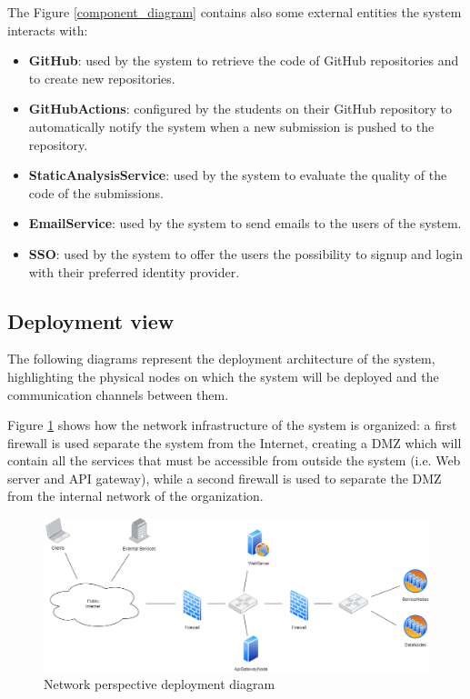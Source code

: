 The Figure \ref{component_diagram} contains also some external entities the system interacts with:
\begin{itemize}
    \item \textbf{GitHub}: used by the system to retrieve the code of GitHub repositories and to create new repositories.
    \item \textbf{GitHubActions}: configured by the students on their GitHub repository to automatically notify the system when a new submission is pushed to the repository.
    \item \textbf{StaticAnalysisService}: used by the system to evaluate the quality of the code of the submissions.
    \item \textbf{EmailService}: used by the system to send emails to the users of the system.
    \item \textbf{SSO}: used by the system to offer the users the possibility to signup and login with their preferred identity provider.
\end{itemize}

\newpage
\subsection{Deployment view}
The following diagrams represent the deployment architecture of the system, highlighting the physical nodes on which the system will be deployed and the communication channels between them.

Figure \ref{deployment_net_diagram} shows how the network infrastructure of the system is organized: a first firewall is used separate the system from the Internet, creating a DMZ which will contain all the services that must be accessible from outside the system (i.e. Web server and API gateway), while a second firewall is used to separate the DMZ from the internal network of the organization.\\
\begin{figure}[H]
    \includegraphics[width=1\textwidth]{Diagrams/deployment_network_diagram.png}
    \caption{Network perspective deployment diagram}
    \label{deployment_net_diagram}
\end{figure}

